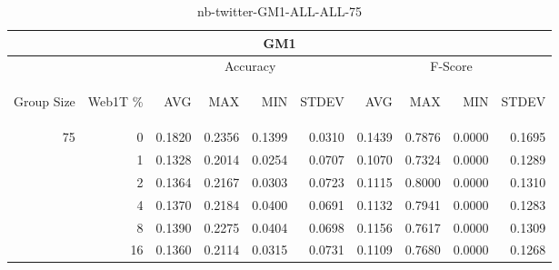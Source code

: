\begin{center}
\begin{table}[htbp]
\begin{tabular}{ | r | r | r | r | r | r | r | r | r | r |}
\hline
\multicolumn{10}{|c|}{GM1}\\
\hline
 & & \multicolumn{4}{|c|}{Accuracy} & \multicolumn{4}{|c|}{F-Score}\\ \cline{3-10}
\begin{sideways}Group Size\end{sideways} & \begin{sideways}Web1T \%\end{sideways} & \begin{sideways}AVG\end{sideways} & \begin{sideways}MAX\end{sideways} & \begin{sideways}MIN\end{sideways} & \begin{sideways}STDEV\end{sideways} & \begin{sideways}AVG\end{sideways} & \begin{sideways}MAX\end{sideways} & \begin{sideways}MIN\end{sideways} & \begin{sideways}STDEV\end{sideways}\\
\hline
\multirow{5}{*}{75}
 & 0 & 0.1820 & 0.2356 & 0.1399 & 0.0310 & 0.1439 & 0.7876 & 0.0000 & 0.1695\\ \cline{2-10}
 & 1 & 0.1328 & 0.2014 & 0.0254 & 0.0707 & 0.1070 & 0.7324 & 0.0000 & 0.1289\\ \cline{2-10}
 & 2 & 0.1364 & 0.2167 & 0.0303 & 0.0723 & 0.1115 & 0.8000 & 0.0000 & 0.1310\\ \cline{2-10}
 & 4 & 0.1370 & 0.2184 & 0.0400 & 0.0691 & 0.1132 & 0.7941 & 0.0000 & 0.1283\\ \cline{2-10}
 & 8 & 0.1390 & 0.2275 & 0.0404 & 0.0698 & 0.1156 & 0.7617 & 0.0000 & 0.1309\\ \cline{2-10}
 & 16 & 0.1360 & 0.2114 & 0.0315 & 0.0731 & 0.1109 & 0.7680 & 0.0000 & 0.1268\\ \cline{2-10}
\hline
\end{tabular}
\caption{nb-twitter-GM1-ALL-ALL-75}
\label{table:nb-twitter-GM1-ALL-ALL-75}
\end{table}
\end{center}

